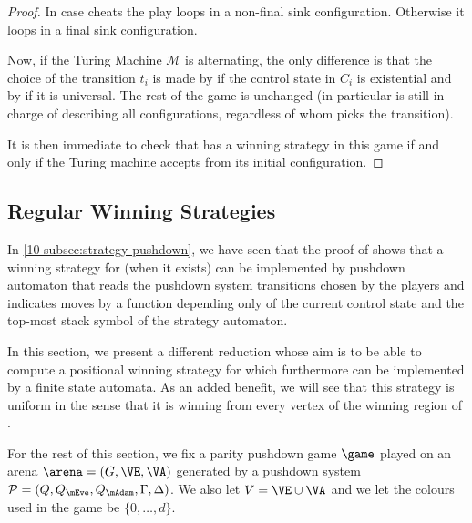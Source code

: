 \begin{proof}
In case \Eve cheats the play loops in a non-final sink configuration. Otherwise it loops in a final sink configuration.

Now, if the Turing Machine $\mathcal{M}$ is alternating, the only difference is that the choice of the transition $t_i$ is made by \Eve if the control state in $C_i$ is existential and by \Adam if it is universal. The rest of the game is unchanged (in particular \Eve is still in charge of describing all configurations, regardless of whom picks the transition).

It is then immediate to check that \Eve has a winning strategy in this game if and only if the Turing machine accepts from its initial configuration.	
\end{proof}




\subsection{Regular Winning Strategies}
\label{10-subsec:regular-strat}


In \ref{10-subsec:strategy-pushdown}, we have seen that the proof of  shows that a winning strategy for \Eve (when it exists) can be implemented by pushdown automaton that reads the pushdown system transitions chosen by the players and indicates \Eve moves by a function depending only of the current control state and the top-most stack symbol of the strategy automaton. 

In this section, we present a different reduction whose aim is to be able to compute a positional winning strategy for \Eve which furthermore can be implemented by a finite state automata. As an added benefit, we will see that this strategy is uniform in the sense that it is winning from every vertex of the winning region of \Eve.

For the rest of this section, we fix a parity pushdown game $\game$ played on an arena $\arena = (G,\VE,\VA)$ generated by a pushdown system $\PDS = (Q,Q_{\mEve}, Q_{\mAdam}, \Gamma,\Delta)$. We also let $V=\VE\cup\VA$ and we let the colours used in the game be $\{0,\dots,d\}$.


